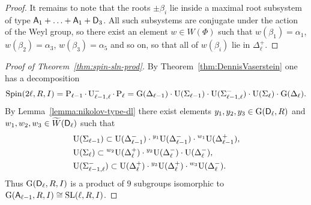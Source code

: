 \begin{proof}
It remains to note that the roots $\pm\beta_i$ lie inside a maximal root subsystem of type $\mathsf{A}_1+\ldots+\mathsf{A}_1+\mathsf{D}_3$. All such subsystems are conjugate under the action of the Weyl group, so there exist an element $w\in W(\Phi)$ such that $w(\beta_1)=\alpha_1$, $w(\beta_2)=\alpha_3$, $w(\beta_3)=\alpha_5$ and so on, so that all of $w(\beta_i)$ lie in $\Delta_\ell^+$.
\end{proof}
\begin{proof}[Proof of Theorem~\ref{thm:spin-sln-prod}]
By Theorem~\ref{thm:DennisVaserstein} one has a decomposition
\[ \operatorname{Spin}(2\ell,R,I) = \operatorname{P}_{\ell-1}\cdot\operatorname{U}_{\ell-1,\ell}^-\cdot\operatorname{P}_{\ell} = \operatorname{G}(\Delta_{\ell-1})\cdot\operatorname{U}(\Sigma_{\ell-1})\cdot\operatorname{U}(\Sigma_{\ell-1,\ell}^-)\cdot\operatorname{U}(\Sigma_{\ell})\cdot\operatorname{G}(\Delta_\ell). \]
By Lemma~\ref{lemma:nikolov-type-dl} there exist elements $y_1,y_2,y_3\in\operatorname{G}(\mathsf{D}_\ell,R)$ and $w_1,w_2,w_3\in\widetilde{W}(\mathsf{D}_\ell)$ such that
\begin{align*}
& \operatorname{U}(\Sigma_{\ell-1}) \subset \operatorname{U}(\Delta_{\ell-1}^-) \cdot {}^{y_1}\!\operatorname{U}(\Delta_{\ell-1}^-) \cdot {}^{w_1}\!\operatorname{U}(\Delta_{\ell-1}^+), \\
& \operatorname{U}(\Sigma_\ell) \subset {}^{w_2}\!\operatorname{U}(\Delta_\ell^+) \cdot {}^{y_2}\!\operatorname{U}(\Delta_\ell^-) \cdot \operatorname{U}(\Delta_\ell^-), \\
& \operatorname{U}(\Sigma_{\ell-1,\ell}^-) \subset \operatorname{U}(\Delta_\ell^+) \cdot {}^{y_3}\!\operatorname{U}(\Delta_\ell^+) \cdot {}^{w_3}\!\operatorname{U}(\Delta_\ell^-).
\end{align*}
Thus $\operatorname{G}(\mathsf{D}_\ell,R,I)$ is a product of $9$ subgroups isomorphic to $\operatorname{G}(\mathsf{A}_{\ell-1},R,I)\cong\operatorname{SL}(\ell,R,I)$.
\end{proof}